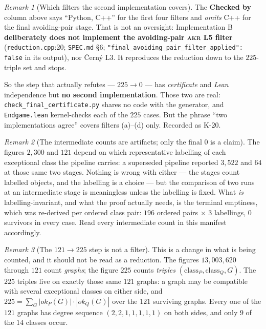 \documentclass[11pt,a4paper]{article}
\theoremstyle{plain}
\theoremstyle{definition}
\theoremstyle{remark}
\newtheorem*{remark}{Remark}
\begin{document}
\begin{remark}[Which filters the second implementation covers]\label{rem:implb-scope}
The \textbf{Checked by} column above says ``Python, C++'' for the first four
filters and \emph{omits} C++ for the final avoiding-pair stage. That is not an
oversight: Implementation B \textbf{deliberately does not implement the
avoiding-pair \textsc{akr} L5 filter} (\texttt{reduction.cpp}:20;
\texttt{SPEC.md} \S6; \texttt{"final\_avoiding\_pair\_filter\_applied": false}
in its output), nor {\v C}ern{\'y} L3. It reproduces the reduction down to the
$225$-triple set and stops.

So the step that actually refutes --- $225 \to 0$ --- has \emph{certificate} and
\emph{Lean} independence but \textbf{no second implementation}. Those two are
real: \texttt{check\_final\_certificate.py} shares no code with the generator,
and \texttt{Endgame.lean} kernel-checks each of the $225$ cases. But the phrase
``two implementations agree'' covers filters (a)--(d) only. Recorded as K-20.
\end{remark}

\begin{remark}[The intermediate counts are artifacts; only the final $0$ is a claim]\label{rem:artifact}
The figures $2{,}300$ and $121$ depend on which representative labelling of each
exceptional class the pipeline carries: a superseded pipeline reported
$3{,}522$ and $64$ at those same two stages. Nothing is wrong with either --- the
stages count labelled objects, and the labelling is a choice --- but the
comparison of two runs at an intermediate stage is meaningless unless the
labelling is fixed. What \emph{is} labelling-invariant, and what the proof
actually needs, is the terminal emptiness, which was re-derived per ordered
class pair: $196$ ordered pairs $\times$ $3$ labellings, $0$ survivors in every
case. Read every intermediate count in this manifest accordingly.
\end{remark}

\begin{remark}[The $121\to225$ step is not a filter]\label{rem:121}
This is a change in what is being counted, and it should not be read as a
reduction. The figures $13{,}003{,}620$ through $121$ count \emph{graphs}; the
figure $225$ counts \emph{triples} $(\text{class}_P,\text{class}_Q,G)$. The $225$
triples live on exactly those same $121$ graphs: a graph may be compatible with
several exceptional classes on either side, and $225=\sum_G |ok_P(G)|\cdot|ok_Q(G)|$
over the $121$ surviving graphs. Every one of the $121$ graphs has degree sequence
$(2,2,1,1,1,1,1)$ on both sides, and only $9$ of the $14$ classes occur.
\end{remark}
\end{document}

